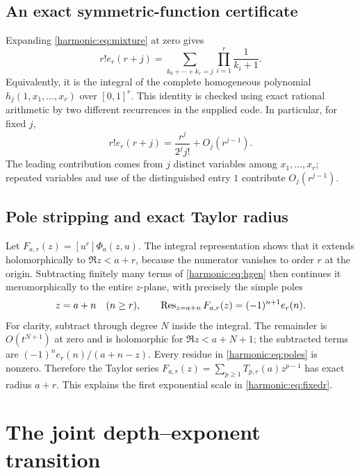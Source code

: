 \subsection{An exact symmetric-function certificate}
Expanding \eqref{harmonic:eq:mixture} at zero gives
\begin{equation}\label{harmonic:eq:composition}
 r!e_r(r+j)=
 \sum_{k_0+\cdots+k_r=j}\prod_{i=1}^r\frac1{k_i+1}.
\end{equation}
Equivalently, it is the integral of the complete homogeneous polynomial
$h_j(1,x_1,\ldots,x_r)$ over $[0,1]^r$. This identity is checked using exact rational arithmetic by two different recurrences in the supplied code. In particular, for fixed $j$,
\begin{equation}\label{harmonic:eq:coefficientAsymp}
 r!e_r(r+j)=\frac{r^j}{2^j j!}+O_j(r^{j-1}).
\end{equation}
The leading contribution comes from $j$ distinct variables among $x_1,\ldots,x_r$; repeated variables and use of the distinguished entry $1$ contribute $O_j(r^{j-1})$.

\subsection{Pole stripping and exact Taylor radius}
Let $F_{a,r}(z)=[u^r]\Phi_a(z,u)$. The integral representation shows that it extends holomorphically to $\Re z<a+r$, because the numerator vanishes to order $r$ at the origin. Subtracting finitely many terms of \eqref{harmonic:eq:hgen} then continues it meromorphically to the entire $z$-plane, with precisely the simple poles
\begin{equation}\label{harmonic:eq:poles}
 z=a+n\quad(n\ge r),\qquad
 \operatorname{Res}_{z=a+n}F_{a,r}(z)=(-1)^{n+1}e_r(n).
\end{equation}
For clarity, subtract through degree $N$ inside the integral. The remainder is $O(t^{N+1})$ at zero and is holomorphic for $\Re z<a+N+1$; the subtracted terms are $(-1)^ne_r(n)/(a+n-z)$. Every residue in \eqref{harmonic:eq:poles} is nonzero. Therefore the Taylor series
$F_{a,r}(z)=\sum_{p\ge1}T_{p,r}(a)z^{p-1}$ has exact radius $a+r$. This explains the first exponential scale in \eqref{harmonic:eq:fixedr}.

\section{The joint depth--exponent transition}
\label{harmonic:sec:transition}

